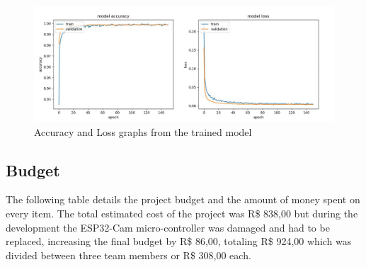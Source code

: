 \documentclass[a4paper,11pt]{article}
\begin{document}
\begin{figure}[H]
  \centering
  \includegraphics[width=12.5cm]{Figures/training_result.png}
  \caption{\small{Accuracy and Loss graphs from the trained model}}
  \label{fig:training_model}
\end{figure}

\subsection{Budget}
The following table details the project budget and the amount of money spent on every item. The total estimated cost of the project was R\$ 838,00 but during the development the ESP32-Cam micro-controller was damaged and had to be replaced, increasing the final budget by R\$ 86,00, totaling R\$ 924,00 which was divided between three team members or R\$ 308,00 each.
\end{document}
